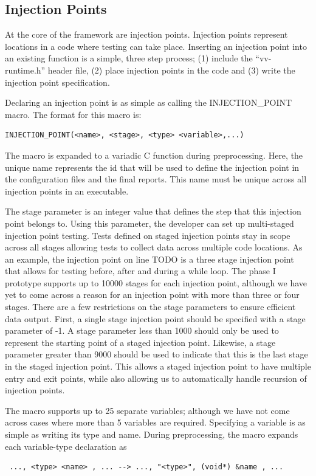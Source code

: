 \subsection{Injection Points}

At the core of the framework are injection points. Injection points represent locations in a code where \VV testing can take place. Inserting an injection point into an existing function is a simple, three step process; (1) include the ``vv-runtime.h'' header file, (2) place injection points in the code and (3) write the injection point specification.

Declaring an injection point is as simple as calling the INJECTION\_POINT macro. The format for this macro is:

\begin{verbatim} 
INJECTION_POINT(<name>, <stage>, <type> <variable>,...)
\end{verbatim}


The macro is expanded to a variadic C function during preprocessing. Here, the unique name represents the id that will be used to define the injection point in the configuration files and the final reports. This name must 
be unique across all injection points in an executable. 

The stage parameter is an integer value that defines the step that this injection point belongs to. Using this parameter, the developer can set up multi-staged injection point testing. Tests defined on staged injection points stay in scope across 
all stages allowing tests to collect data across multiple code locations. As an example, the injection point on line TODO is a three stage injection point that allows for testing before, after and during a while loop. The phase I prototype supports up to 10000 stages for each injection point, although we have yet to come across a reason for an injection point with more than three or four stages. There are a few restrictions on the stage parameters to ensure efficient data output. First, a single stage injection point should be specified with a stage parameter of -1. A stage parameter less than 1000 should only be used to represent the starting point of a staged injection point. Likewise, a stage parameter greater than 9000 should be used to indicate that this is the last stage in the staged injection point. This allows a staged injection point to have multiple entry and exit points, while also allowing us to automatically handle recursion of injection points.  

The macro supports up to 25 separate variables; although we have not come across cases where more than 5 variables are required. Specifying a variable is as simple 
as writing its type and name. During preprocessing, the macro expands each variable-type declaration as 
\begin{verbatim}
 ..., <type> <name> , ... --> ..., "<type>", (void*) &name , ... 
\end{verbatim}

